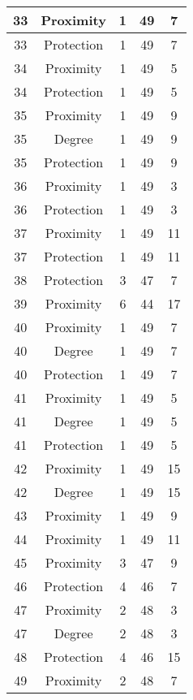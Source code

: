 \documentclass[results.tex]{subfiles}
\begin{document}
\begin{center}
\begin{tabular}{| c || c | c | c | c |}
    \hline
    33 & Proximity & 1 & 49 & 7 \\ 
    \hline
    33 & Protection & 1 & 49 & 7 \\ 
    \hline
    34 & Proximity & 1 & 49 & 5 \\ 
    \hline
    34 & Protection & 1 & 49 & 5 \\ 
    \hline
    35 & Proximity & 1 & 49 & 9 \\ 
    \hline
    35 & Degree & 1 & 49 & 9 \\ 
    \hline
    35 & Protection & 1 & 49 & 9 \\ 
    \hline
    36 & Proximity & 1 & 49 & 3 \\ 
    \hline
    36 & Protection & 1 & 49 & 3 \\ 
    \hline
    37 & Proximity & 1 & 49 & 11 \\ 
    \hline
    37 & Protection & 1 & 49 & 11 \\ 
    \hline
    38 & Protection & 3 & 47 & 7 \\ 
    \hline
    39 & Proximity & 6 & 44 & 17 \\ 
    \hline
    40 & Proximity & 1 & 49 & 7 \\ 
    \hline
    40 & Degree & 1 & 49 & 7 \\ 
    \hline
    40 & Protection & 1 & 49 & 7 \\ 
    \hline
    41 & Proximity & 1 & 49 & 5 \\ 
    \hline
    41 & Degree & 1 & 49 & 5 \\ 
    \hline
    41 & Protection & 1 & 49 & 5 \\ 
    \hline
    42 & Proximity & 1 & 49 & 15 \\ 
    \hline
    42 & Degree & 1 & 49 & 15 \\ 
    \hline
    43 & Proximity & 1 & 49 & 9 \\ 
    \hline
    44 & Proximity & 1 & 49 & 11 \\ 
    \hline
    45 & Proximity & 3 & 47 & 9 \\ 
    \hline
    46 & Protection & 4 & 46 & 7 \\ 
    \hline
    47 & Proximity & 2 & 48 & 3 \\ 
    \hline
    47 & Degree & 2 & 48 & 3 \\ 
    \hline
    48 & Protection & 4 & 46 & 15 \\ 
    \hline
    49 & Proximity & 2 & 48 & 7 \\ 
    \hline   \end{tabular}
\end{center}
\end{document}
